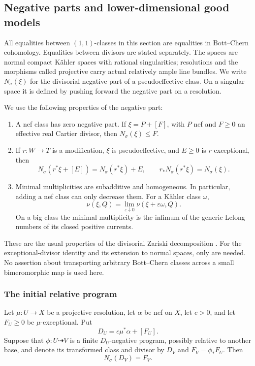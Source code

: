 \subsection{Negative parts and lower-dimensional good models}
\label{repair:sec:negative-part-replacement}

All equalities between $(1,1)$-classes in this section are equalities in
Bott--Chern cohomology. Equalities between divisors are stated separately.
The spaces are normal compact K\"ahler spaces with rational singularities;
resolutions and the morphisms called projective carry actual relatively
ample line bundles. We write $N_\sigma(\xi)$ for the divisorial negative
part of a pseudoeffective class. On a singular space it is defined by
pushing forward the negative part on a resolution.

We use the following properties of the negative part:
\begin{enumerate}
\item A nef class has zero negative part. If $\xi=P+[F]$, with $P$ nef
and $F\geq0$ an effective real Cartier divisor, then
$N_\sigma(\xi)\leq F$.
\item If $r:W\to T$ is a modification, $\xi$ is pseudoeffective, and
$E\geq0$ is $r$-exceptional, then
\[
 N_\sigma(r^*\xi+[E])=N_\sigma(r^*\xi)+E,
 \qquad r_*N_\sigma(r^*\xi)=N_\sigma(\xi).
\]
\item Minimal multiplicities are subadditive and homogeneous. In
particular, adding a nef class can only decrease them. For a K\"ahler
class $\omega$,
\[
 \nu(\xi,Q)=\lim_{\varepsilon\downarrow0}
                 \nu(\xi+\varepsilon\omega,Q).
\]
On a big class the minimal multiplicity is the infimum of the generic
Lelong numbers of its closed positive currents.
\end{enumerate}
These are the usual properties of the divisorial Zariski decomposition
\cite[\S3]{Boucksom2004}. For the exceptional-divisor identity and its
extension to normal spaces, only
\cite[Appendix~A, Lemmas~A.3, A.5 and A.7]{DHY2023} are needed.
No assertion about transporting arbitrary Bott--Chern classes across a
small bimeromorphic map is used here.

\subsubsection{The initial relative program}

\begin{lemma}
\label{repair:lem:negative-part-relative-program}
Let $\mu:U\to X$ be a projective resolution, let $\alpha$ be nef on $X$,
let $c>0$, and let $F_U\geq0$ be $\mu$-exceptional. Put
\[
 D_U=c\mu^*\alpha+[F_U].
\]
Suppose that $\phi:U\dasharrow V$ is a finite $D_U$-negative program,
possibly relative to another base, and denote its transformed class and
divisor by $D_V$ and $F_V=\phi_*F_U$. Then
\[
                         N_\sigma(D_V)=F_V.
\]
\end{lemma}

